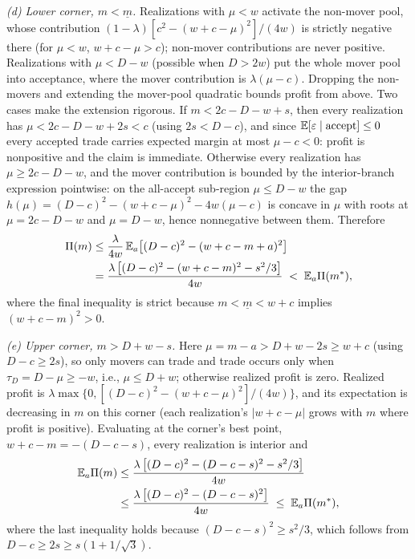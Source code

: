 \emph{(d) Lower corner, $m < \underline{m}$.} Realizations with $\mu < w$ activate the non-mover pool, whose contribution $(1-\lambda)[c^2 - (w + c - \mu)^2]/(4w)$ is strictly negative there (for $\mu < w$, $w + c - \mu > c$); non-mover contributions are never positive. Realizations with $\mu < D - w$ (possible when $D > 2w$) put the whole mover pool into acceptance, where the mover contribution is $\lambda(\mu - c)$. Dropping the non-movers and extending the mover-pool quadratic bounds profit from above. Two cases make the extension rigorous. If $m < 2c - D - w + s$, then every realization has $\mu < 2c - D - w + 2s < c$ (using $2s < D - c$), and since $\mathbb{E}[\varepsilon \mid \text{accept}] \le 0$ every accepted trade carries expected margin at most $\mu - c < 0$: profit is nonpositive and the claim is immediate. Otherwise every realization has $\mu \ge 2c - D - w$, and the mover contribution is bounded by the interior-branch expression pointwise: on the all-accept sub-region $\mu \le D - w$ the gap $h(\mu) = (D-c)^2 - (w + c - \mu)^2 - 4w(\mu - c)$ is concave in $\mu$ with roots at $\mu = 2c - D - w$ and $\mu = D - w$, hence nonnegative between them. Therefore
\begin{align*}
\Pi(m) &\le \frac{\lambda}{4w}\,\mathbb{E}_a\!\left[ (D-c)^2 - (w + c - m + a)^2 \right] \\
&= \frac{\lambda \left[ (D-c)^2 - (w + c - m)^2 - s^2/3 \right]}{4w}
\;<\; \mathbb{E}_a \Pi(m^*),
\end{align*}
where the final inequality is strict because $m < \underline{m} < w + c$ implies $(w + c - m)^2 > 0$.

\emph{(e) Upper corner, $m > D + w - s$.} Here $\mu = m - a > D + w - 2s \ge w + c$ (using $D - c \ge 2s$), so only movers can trade and trade occurs only when $\tau_D = D - \mu \ge -w$, i.e., $\mu \le D + w$; otherwise realized profit is zero. Realized profit is $\lambda \max\{0, [(D-c)^2 - (w+c-\mu)^2]/(4w)\}$, and its expectation is decreasing in $m$ on this corner (each realization's $|w + c - \mu|$ grows with $m$ where profit is positive). Evaluating at the corner's best point, $w + c - m = -(D - c - s)$, every realization is interior and
\begin{align*}
\mathbb{E}_a \Pi(m) &\le \frac{\lambda \left[ (D-c)^2 - (D - c - s)^2 - s^2/3 \right]}{4w} \\
&\le \frac{\lambda \left[ (D-c)^2 - (D - c - s)^2 \right]}{4w}
\;\le\; \mathbb{E}_a \Pi(m^*),
\end{align*}
where the last inequality holds because $(D - c - s)^2 \ge s^2/3$, which follows from $D - c \ge 2s \ge s(1 + 1/\sqrt{3})$.

